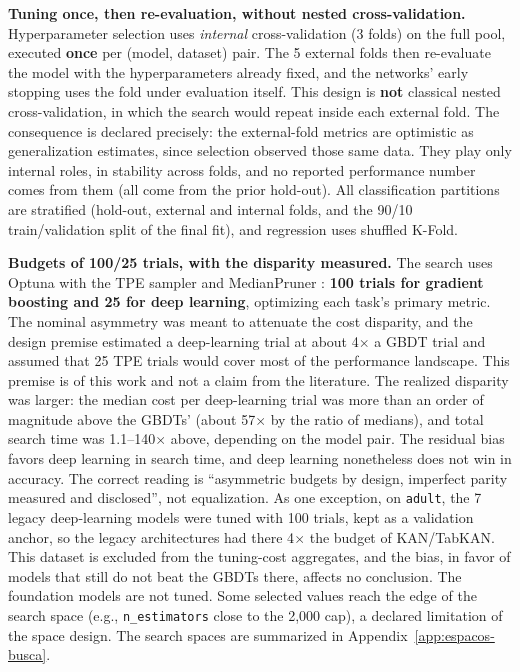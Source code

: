 \textbf{Tuning once, then re-evaluation, without nested
cross-validation.} Hyperparameter selection uses \emph{internal}
cross-validation (3 folds) on the full pool, executed \textbf{once}
per (model, dataset) pair. The 5 external folds then re-evaluate the
model with the hyperparameters already fixed, and the networks'
early stopping uses the fold under evaluation itself. This design is
\textbf{not} classical nested cross-validation, in which the search
would repeat inside each external fold. The consequence is declared
precisely: the external-fold metrics are optimistic as
generalization estimates, since selection observed those same data.
They play only internal roles, in stability across folds, and no reported performance number comes from them (all come from the prior hold-out).
All classification partitions are stratified (hold-out, external and
internal folds, and the 90/10 train/validation split of the final
fit), and regression uses shuffled K-Fold.

\textbf{Budgets of 100/25 trials, with the disparity measured.} The
search uses Optuna with the TPE sampler and MedianPruner
\citep{akiba2019}: \textbf{100 trials for gradient boosting and 25
for deep learning}, optimizing each task's primary metric. The
nominal asymmetry was meant to attenuate the cost disparity, and the
design premise estimated a deep-learning trial at about 4$\times$ a
GBDT trial and assumed that 25 TPE trials would cover most of the
performance landscape. This premise is of this work and not a claim from the literature. The realized disparity was larger: the
median cost per deep-learning trial was more than an order of
magnitude above the GBDTs' (about 57$\times$ by the ratio of
medians), and total search time was 1.1--140$\times$ above,
depending on the model pair. The residual bias favors deep learning
in search time, and deep learning nonetheless does not win in
accuracy. The correct reading is ``asymmetric budgets by design,
imperfect parity measured and disclosed'', not equalization. As one
exception, on \texttt{adult}, the 7 legacy deep-learning models were
tuned with 100 trials, kept as a validation anchor, so the legacy
architectures had there 4$\times$ the budget of KAN/TabKAN. This
dataset is excluded from the tuning-cost aggregates, and the bias,
in favor of models that still do not beat the GBDTs there, affects
no conclusion. The foundation models are not tuned. Some selected
values reach the edge of the search space (e.g.,
\texttt{n\_estimators} close to the 2{,}000 cap), a declared
limitation of the space design. The search spaces are summarized in
Appendix~\ref{app:espacos-busca}.

